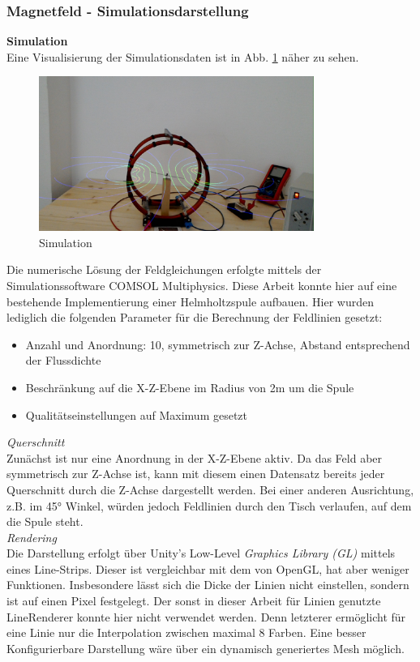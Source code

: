 \subsubsection{Magnetfeld - Simulationsdarstellung}
\textbf{Simulation}\\
Eine Visualisierung der Simulationsdaten ist in Abb. \ref{img:mfield-simulation} näher zu sehen.
\begin{figure}[H]
	\centering
	\includegraphics[width=0.8\textwidth]{images/HL/simulation.jpg}
	\caption{Simulation}
	\label{img:mfield-simulation}
\end{figure}


Die numerische Lösung der Feldgleichungen erfolgte mittels der Simulationssoftware COMSOL Multiphysics. Diese Arbeit konnte hier auf eine bestehende Implementierung einer Helmholtzspule aufbauen. Hier wurden lediglich die folgenden Parameter für die Berechnung der Feldlinien gesetzt:
\begin{itemize}
	\setlength{\itemsep}{-1pt}
	\singlespacing
	\item Anzahl und Anordnung: 10, symmetrisch zur Z-Achse, Abstand entsprechend der Flussdichte
	\item Beschränkung auf die X-Z-Ebene im Radius von 2m um die Spule
	\item Qualitätseinstellungen auf Maximum gesetzt
\end{itemize}

\textit{Querschnitt}\\
Zunächst ist nur eine Anordnung in der X-Z-Ebene aktiv. Da das Feld aber symmetrisch zur Z-Achse ist, kann mit diesem einen Datensatz bereits jeder Querschnitt durch die Z-Achse dargestellt werden. Bei einer anderen Ausrichtung, z.B. im 45° Winkel, würden jedoch Feldlinien durch den Tisch verlaufen, auf dem die Spule steht.\\

\textit{Rendering}\\
Die Darstellung erfolgt über Unity's Low-Level \textit{Graphics Library (GL)} mittels eines Line-Strips. Dieser ist vergleichbar mit dem von OpenGL, hat aber weniger Funktionen. Insbesondere lässt sich die Dicke der Linien nicht einstellen, sondern ist auf einen Pixel festgelegt. Der sonst in dieser Arbeit für Linien genutzte LineRenderer konnte hier nicht verwendet werden. Denn letzterer ermöglicht für eine Linie nur die Interpolation zwischen maximal 8 Farben. Eine besser Konfigurierbare Darstellung wäre über ein dynamisch generiertes Mesh möglich.\\

